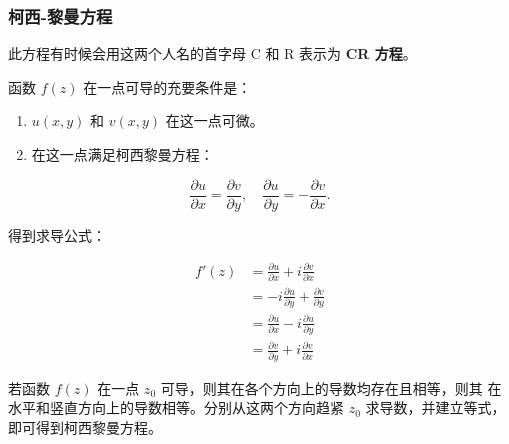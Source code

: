 \subsubsection{柯西-黎曼方程}
\label{柯西-黎曼方程}
此方程有时候会用这两个人名的首字母 C 和 R 表示为 \textbf{CR 方程}。

函数 \(f(z)\) 在一点可导的充要条件是：

\begin{enumerate}
\item \(u(x,y)\) 和 \(v(x,y)\) 在这一点可微。
\item 在这一点满足柯西黎曼方程：
\end{enumerate}

\[
\frac{\partial u}{\partial x} = \frac{\partial v}{\partial y},\quad \frac{\partial u}{\partial y} = -\frac{\partial v}{\partial x}.
\]

得到求导公式：

\begin{equation*}
\begin{aligned}
   f'(z) &= \frac{\partial u}{\partial x}+i\frac{\partial v}{\partial x}\\
   &=-i\frac{\partial u}{\partial y}+\frac{\partial v}{\partial y}\\
   &=\frac{\partial u}{\partial x}-i\frac{\partial u}{\partial y}\\
   &=\frac{\partial v}{\partial y}+i\frac{\partial v}{\partial x}
\end{aligned}
\end{equation*}

\begin{tcolorbox}[title={解释},colback=red!5!white
,colframe=red!75!black
,colbacktitle=yellow!50!red
,coltitle=red!25!black, fonttitle=\bfseries,subtitle style={boxrule=0.4pt, colback=yellow!50!red!25!white}]
若函数 \(f(z)\) 在一点 \(z_{0}\) 可导，则其在各个方向上的导数均存在且相等，则其
在水平和竖直方向上的导数相等。分别从这两个方向趋紧 \(z_{0}\) 求导数，并建立等式，
即可得到柯西黎曼方程。

\end{tcolorbox}

